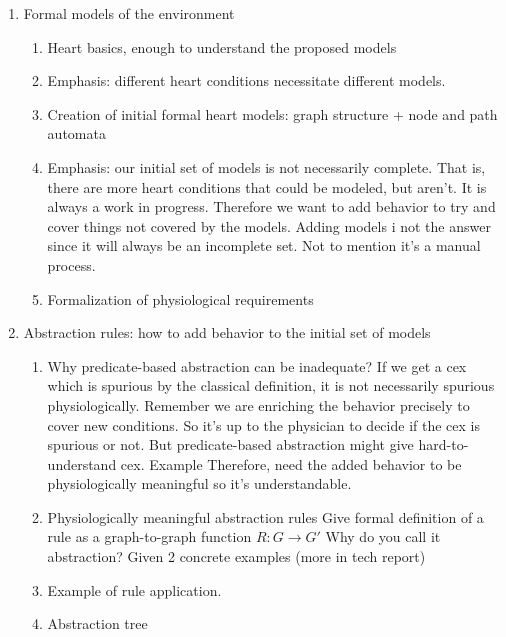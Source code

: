 \begin{enumerate}
	\item Formal models of the environment
	\begin{enumerate}
		\item Heart basics, enough to understand the proposed models
		\item Emphasis: different heart conditions necessitate different models.
		\item Creation of initial formal heart models: graph structure + node and path automata
		\item Emphasis: our initial set of models is not necessarily complete. That is, there are more heart conditions that could be modeled, but aren't. It is always a work in progress.	
		\subitem Therefore we want to add behavior to try and cover things not covered by the models. Adding models i not the answer since it will always be an incomplete set. Not to mention it's a manual process.
		\item Formalization of physiological requirements
	\end{enumerate}
	
	\item Abstraction rules: how to add behavior to the initial set of models
	\begin{enumerate}
		\item Why predicate-based abstraction can be inadequate?
		\subitem If we get a cex which is spurious by the classical definition, it is not necessarily spurious physiologically. Remember we are enriching the behavior precisely to cover new conditions.
		\subitem So it's up to the physician to decide if the cex is spurious or not. But predicate-based abstraction might give hard-to-understand cex.
		\subitem Example
		\subitem Therefore, need the added behavior to be physiologically meaningful so it's understandable.
		\item Physiologically meaningful abstraction rules
		\subitem Give formal definition of a rule as a graph-to-graph function $R: G \rightarrow G'$ 
		\subitem Why do you call it abstraction? 
		\subitem Given 2 concrete examples (more in tech report)
		\item Example of rule application.
		\item Abstraction tree		
	\end{enumerate}
	

\end{enumerate}

